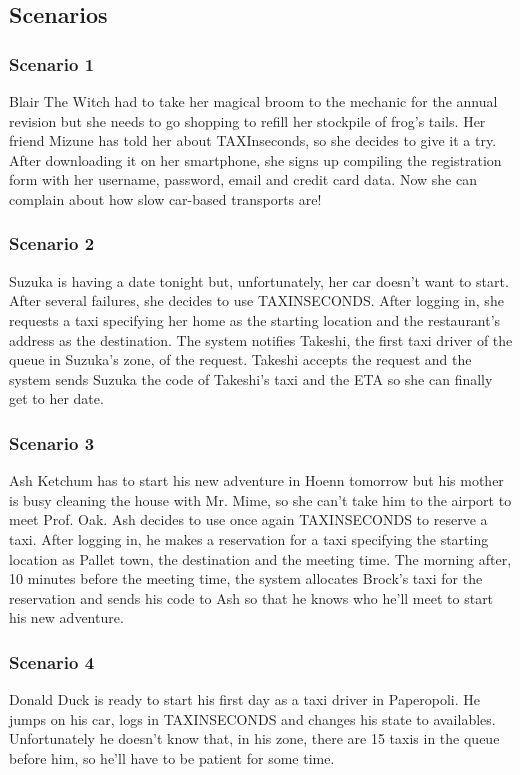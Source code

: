 \documentclass{article}
\begin{document}
\subsection{Scenarios}
\subsubsection{Scenario 1}
Blair The Witch had to take her magical broom to the mechanic for the annual revision but she needs to go shopping to refill her stockpile of frog's tails. Her friend Mizune has told her about TAXInseconds, so she decides to give it a try. After downloading it on her smartphone, she signs up compiling the registration form with her username, password, email and credit card data. Now she can complain about how slow car-based transports are!
\subsubsection{Scenario 2}
Suzuka is having a date tonight but, unfortunately, her car doesn't want to start. After several failures, she decides to use TAXINSECONDS. After logging in, she requests a taxi specifying her home as the starting location and the restaurant's address as the destination. The system notifies Takeshi, the first taxi driver of the queue in Suzuka's zone, of the request. Takeshi accepts the request and the system sends Suzuka the code of Takeshi's taxi and the ETA so she can finally get to her date.
\subsubsection{Scenario 3}
Ash Ketchum has to start his new adventure in Hoenn tomorrow but his mother is busy cleaning the house with Mr. Mime, so she can't take him to the airport to meet Prof. Oak. Ash decides to use once again TAXINSECONDS to reserve a taxi. After logging in, he makes a reservation for a taxi specifying the starting location as Pallet town, the destination and the meeting time. The morning after, 10 minutes before the meeting time, the system allocates Brock's taxi for the reservation and sends his code to Ash so that he knows who he'll meet to start his new adventure. 
\subsubsection{Scenario 4}
Donald Duck is ready to start his first day as a taxi driver in Paperopoli. He jumps on his car, logs in TAXINSECONDS and changes his state to availables. Unfortunately he doesn't know that, in his zone, there are 15 taxis in the queue before him, so he'll have to be patient for some time.
\end{document}

